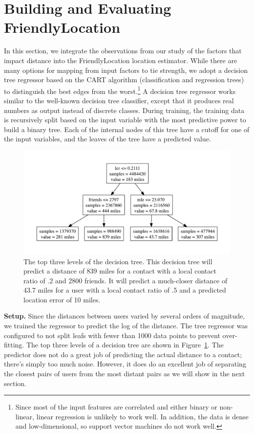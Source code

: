 \documentclass[letterpaper]{article}
\begin{document}
\section{Building and Evaluating FriendlyLocation}

In this section, we integrate the observations from our study of the factors that impact distance into the FriendlyLocation location estimator.
%
While there are many options for mapping from input factors to tie strength, we adopt a decision tree regressor based on the CART algorithm (classification and regression trees) to distinguish the best edges from the worst.\footnote{Since most of the input features are correlated and either binary or non-linear,
linear regression is unlikely to work well. In addition, the data is dense and low-dimensional, so support vector machines
do not work well.} A decision tree regressor works similar to the well-known decision tree classifier, except that it produces real numbers as output instead of discrete classes. During training, the training data is recursively split based on the input
variable with the most predictive power to build a binary tree.  Each of the internal nodes of this tree have a cutoff for one of the input
variables, and the leaves of the tree have a predicted value.


\begin{figure}[tb]
\centering
\includegraphics[width=.8\linewidth]{figures/tree_top.pdf}
\caption{
    The top three levels of the decision tree. This decision tree will predict a
    distance of 839 miles for a contact with a local contact ratio of .2 and
    2800 friends. It will predict a much-closer distance of 43.7 miles for a
    user with a local contact ratio of .5 and a predicted location error of 10
    miles.
}
\label{fig:TreeTop}
\end{figure}

\noindent\textbf{Setup.} Since the distances between users varied by several orders of magnitude, we
trained the regressor to predict the log of the distance.
%
The tree regressor was configured to not split leafs with fewer than 1000 data
points to prevent over-fitting.
%
The top three levels of a decision tree are shown in Figure~\ref{fig:TreeTop}.
%
The predictor does not do a great job of predicting the actual distance to a
contact; there's simply too much noise.
%
However, it does do an excellent job of separating the closest pairs of users
from the most distant pairs as we will show in the next section.
\end{document}
